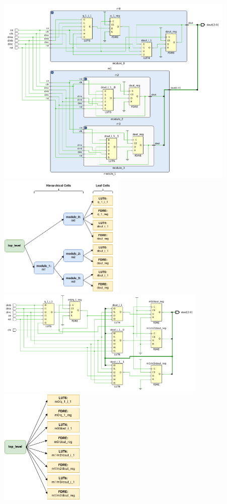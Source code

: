 {
    \centering
    \includegraphics[valign=c, width=11.5cm]{figures/netlist_synth/hier_netlist.png}
    \includegraphics[valign=c, width=6cm]{figures/netlist_synth/hier_graph.png}
    \label{fig:hier_netlist}
}
\vspace{0.5cm}
{
    \centering
    \includegraphics[valign=c, width=10cm]{figures/netlist_synth/flat_netlist.png}
    \includegraphics[valign=c, width=4cm]{figures/netlist_synth/flat_graph.png}
    \label{fig:flat_netlist}
}
